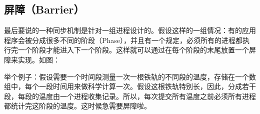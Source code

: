 \documentclass{article}
\begin{document}
\begin{CJK}{UTF8}{gbsn}
\section{屏障（Barrier）}
    最后要说的一种同步机制是针对一组进程设计的。假设这样的一组情况：有的应用程序会被分成很多不同的阶段（Phase），并且有一个规定，必须所有的进程都执行完一个阶段才能进入下一个阶段。这样就可以通过在每个阶段的末尾放置一个屏障来实现。如图：

    举个例子：假设需要一个时间段测量一次一根铁轨的不同段的温度，存储在一个数组中，每个一段时间用来做科学计算一次。假设这根铁轨特别长，因此，分成若干段，每段的温度由一个进程收集记录。所以，每次提交所有温度之前必须所有进程都统计完这阶段的温度。这时候急需要屏障啦。


\end{CJK}
\end{document}

